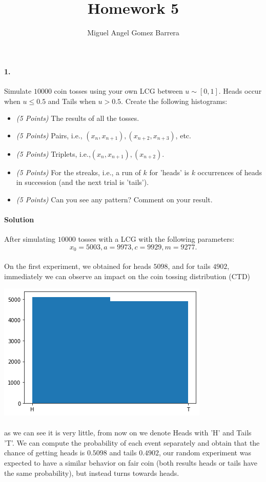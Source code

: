 \documentclass{article}
\title{Homework 5}
\author{Miguel Angel Gomez Barrera}
\begin{document}
	\maketitle
\paragraph{1.} Simulate $10000$ coin tosses using your own LCG between $u \sim [0,1]$. Heads occur when $u \leq 0.5$ and Tails when $u > 0.5$. Create the following histograms:
\begin{itemize}
	\item \textit{(5 Points)} The results of all the tosses.
	\item \textit{(5 Points)} Pairs, i.e., $(x_n, x_{n+1}), (x_{n+2}, x_{n+3})$, etc.
	\item \textit{(5 Points)} Triplets, i.e.,$(x_n, x_{n+1}), (x_{n+2})$.
	\item \textit{(5 Points)} For the streaks, i.e., a run of $k$ for 'heads' is $k$ occurrences of heads in succession (and the next trial is 'tails').
	\item \textit{(5 Points)} Can you see any pattern? Comment on your result.
\end{itemize}
\paragraph{Solution} After simulating $10000$ tosses with a LCG with the following parameters:
$$x_0 = 5003, a = 9973, c = 9929, m = 9277.$$
\paragraph{}On the first experiment, we obtained for heads $5098$, and for tails $4902$, immediately we can observe an impact on the coin tossing distribution (CTD)
\begin{center}
	\includegraphics[width=0.4\linewidth]{all.png}
\end{center}
\paragraph{} as we can see it is very little, from now on we denote Heads with 'H' and Tails 'T'. We can compute the probability of each event separately and obtain that the chance of getting heads is $0.5098$ and tails $0.4902$, our random experiment was expected to have a similar behavior on fair coin (both results heads or tails have the same probability), but instead turns towards heads.
\end{document}
